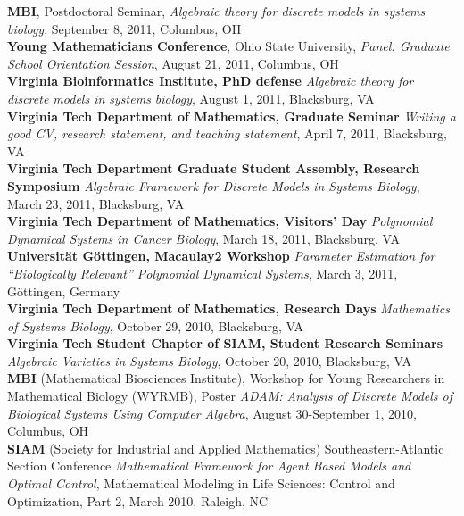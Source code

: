 \documentclass[10pt]{article}
\begin{document}
  \textbf{MBI}, Postdoctoral Seminar, {\it Algebraic theory for discrete models in systems biology}, September 8, 2011, Columbus, OH\\

  \textbf{Young Mathematicians Conference}, Ohio State University, {\it Panel: Graduate School Orientation Session}, August 21, 2011, Columbus, OH\\

  \textbf{Virginia Bioinformatics Institute, PhD defense}
  \textit{Algebraic theory for discrete models in systems biology}, August 1, 2011, Blacksburg, VA\\

  \textbf{Virginia Tech Department of Mathematics, Graduate Seminar}
  \textit{Writing a good CV, research statement, and teaching statement}, April
  7, 2011, Blacksburg, VA\\

  \textbf{Virginia Tech Department Graduate Student Assembly, Research
  Symposium}
  \textit{Algebraic Framework for Discrete Models in Systems Biology}, March
  23, 2011, Blacksburg, VA\\

  \textbf{Virginia Tech Department of Mathematics, Visitors' Day}
  \textit{Polynomial Dynamical Systems in Cancer Biology}, March 18, 2011,
  Blacksburg, VA\\

  \textbf{Universit\"at G\"ottingen, Macaulay2 Workshop} \textit{Parameter
  Estimation for ``Biologically Relevant'' Polynomial Dynamical Systems}, March
  3, 2011, G\"ottingen, Germany\\

  \textbf{Virginia Tech Department of Mathematics, Research Days}
  \textit{Mathematics of Systems Biology}, October 29, 2010, Blacksburg, VA \\

  \textbf{Virginia Tech Student Chapter of SIAM, Student Research Seminars}
  \textit{Algebraic Varieties in Systems Biology}, October 20, 2010, Blacksburg, VA \\

  \textbf{MBI} (Mathematical Biosciences Institute), Workshop for Young Researchers 
  in Mathematical Biology (WYRMB), Poster \textit{ADAM: Analysis of Discrete
  Models of Biological Systems Using Computer Algebra}, August 30-September 1,
  2010, Columbus, OH\\

  \textbf{SIAM} (Society for Industrial and Applied Mathematics)
  Southeastern-Atlantic Section Conference \textit{Mathematical Framework for
  Agent Based Models and Optimal Control}, Mathematical Modeling in Life
  Sciences: Control and Optimization, Part 2, March 2010, Raleigh, NC\\
\end{document}
